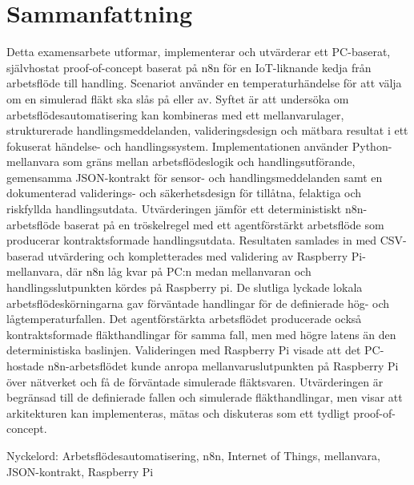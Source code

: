 


\section*{Sammanfattning}\label{sec:sammanfattning}

Detta examensarbete utformar, implementerar och utvärderar ett PC-baserat, självhostat proof-of-concept baserat på n8n för en IoT-liknande kedja från arbetsflöde till handling. Scenariot använder en temperaturhändelse för att välja om en simulerad fläkt ska slås på eller av. Syftet är att undersöka om arbetsflödesautomatisering kan kombineras med ett mellanvarulager, strukturerade handlingsmeddelanden, valideringsdesign och mätbara resultat i ett fokuserat händelse- och handlingssystem. Implementationen använder Python-mellanvara som gräns mellan arbetsflödeslogik och handlingsutförande, gemensamma JSON-kontrakt för sensor- och handlingsmeddelanden samt en dokumenterad validerings- och säkerhetsdesign för tillåtna, felaktiga och riskfyllda handlingsutdata. Utvärderingen jämför ett deterministiskt n8n-arbetsflöde baserat på en tröskelregel med ett agentförstärkt arbetsflöde som producerar kontraktsformade handlingsutdata. Resultaten samlades in med CSV-baserad utvärdering och kompletterades med validering av Raspberry Pi-mellanvara, där n8n låg kvar på PC:n medan mellanvaran och handlingsslutpunkten kördes på Raspberry pi. De slutliga lyckade lokala arbetsflödeskörningarna gav förväntade handlingar för de definierade hög- och lågtemperaturfallen. Det agentförstärkta arbetsflödet producerade också kontraktsformade fläkthandlingar för samma fall, men med högre latens än den deterministiska baslinjen. Valideringen med Raspberry Pi visade att det PC-hostade n8n-arbetsflödet kunde anropa mellanvaruslutpunkten på Raspberry Pi över nätverket och få de förväntade simulerade fläktsvaren. Utvärderingen är begränsad till de definierade fallen och simulerade fläkthandlingar, men visar att arkitekturen kan implementeras, mätas och diskuteras som ett tydligt proof-of-concept.

Nyckelord: Arbetsflödesautomatisering, n8n, Internet of Things, mellanvara, JSON-kontrakt, Raspberry Pi